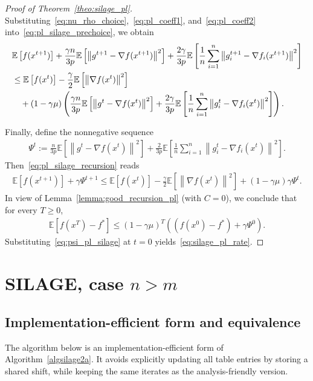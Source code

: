 \documentclass{article}
\newcommand{\bb}{\mathbb}
\newcommand{\sqn}[1]{\left\| #1 \right\|^2}
\newcommand{\fstar}{f^*}
\newcommand{\eqdef}{:=}
\newcommand{\Exp}[1]{{\bb E}\left[#1\right]}
\theoremstyle{plain}
\newcommand{\algname}[1]{{\sf\scalefont{0.88}\color{mydarkgreen}#1}\xspace}
\def\algname#1{#1}%
\begin{document}
\begin{proof}[Proof of Theorem~\ref{theo:silage_pl}]
Substituting~\eqref{eq:nu_rho_choice},~\eqref{eq:pl_coeff1}, and~\eqref{eq:pl_coeff2} into~\eqref{eq:pl_silage_prechoice}, we obtain
\begin{align}
&\Exp{f(x^{t+1})}
+ \frac{\gamma n}{3p}\Exp{\sqn{g^{t+1}-\nabla f(x^{t+1})}}
+ \frac{2\gamma}{3p}\Exp{\frac{1}{n}\sum_{i=1}^n\sqn{g_i^{t+1}-\nabla f_i(x^{t+1})}}\notag\\
&\leq \Exp{f(x^{t})}
-\frac{\gamma}{2}\Exp{\sqn{\nabla f(x^t)}} \notag\\
&\quad + (1-\gamma\mu)\left(
\frac{\gamma n}{3p}\Exp{\sqn{g^{t}-\nabla f(x^{t})}}
+ \frac{2\gamma}{3p}\Exp{\frac{1}{n}\sum_{i=1}^n\sqn{g_i^{t}-\nabla f_i(x^{t})}}
\right).
\label{eq:pl_silage_recursion}
\end{align}

Finally, define the nonnegative sequence
\begin{align}
\label{eq:psi_pl_silage}
\Psi^t \eqdef \frac{n}{3p}\Exp{\sqn{g^{t}-\nabla f(x^{t})}}
+ \frac{2}{3p}\Exp{\frac{1}{n}\sum_{i=1}^n\sqn{g_i^{t}-\nabla f_i(x^{t})}}.
\end{align}
Then~\eqref{eq:pl_silage_recursion} reads
\begin{align*}
\Exp{f(x^{t+1})} + \gamma \Psi^{t+1}
\leq \Exp{f(x^{t})} -\frac{\gamma}{2}\Exp{\sqn{\nabla f(x^t)}} + (1-\gamma\mu)\gamma \Psi^{t}.
\end{align*}
In view of Lemma~\ref{lemma:good_recursion_pl} (with $C=0$), we conclude that for every $T\geq 0$,
\begin{align*}
\Exp{f(x^{T})-\fstar} \leq (1-\gamma\mu)^{T}\left((f(x^0)-\fstar)+\gamma\Psi^0\right).
\end{align*}
Substituting~\eqref{eq:psi_pl_silage} at $t=0$ yields~\eqref{eq:silage_pl_rate}.
\end{proof}

\newpage
\section{\algname{SILAGE}, case $n>m$}
\subsection{Implementation-efficient form and equivalence}\label{sec:equiv-n>m}

The algorithm below is an implementation-efficient form of Algorithm~\ref{algsilage2a}.
It avoids explicitly updating all table entries by storing a shared shift, while keeping the same iterates as the analysis-friendly version.
\end{document}
